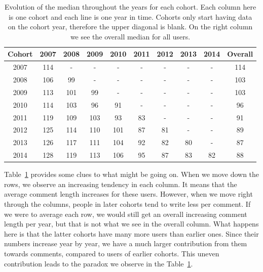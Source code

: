 \begin{table}[!tb]
\centering
\tabcolsep=0.11cm
\singlespacing
\fontsize{7pt}{8pt}\selectfont
\begin{tabular}{|c|c|c|c|c|c|c|c|c|c|}
\hline
Cohort & 2007 & 2008 & 2009 & 2010 & 2011 & 2012 & 2013 & 2014 & Overall\\ \hline
2007 & 114 & - & - & - & - & - & - & - & 114 \\ \hline
2008 & 106 & 99 & - & - & - & - & - & - & 103 \\ \hline
2009 & 113 & 101 & 99 & - & - & - & - & - & 103 \\ \hline
2010 & 114 & 103 & 96 & 91 & - & - & - & - & 96 \\ \hline
2011 & 119 & 109 & 103 & 93 & 83 & - & - & - & 91 \\ \hline
2012 & 125 & 114 & 110 & 101 & 87 & 81 & - & - & 89 \\ \hline
2013 & 126 & 117 & 111 & 104 & 92 & 82 & 80 & - & 87 \\ \hline
2014 & 128 & 119 & 113 & 106 & 95 & 87 & 83 & 82 & 88 \\ \hline
\end{tabular}
\caption{Evolution of the median throughout the years for each cohort. Each column here is one cohort and each line is one year in time. Cohorts only start having data on the cohort year, therefore the upper diagonal is blank. On the right column we see the overall median for all users.}
\label{tab:simpson}
\end{table}


Table~\ref{tab:simpson} provides some clues to what might be going on. When we move down the rows, we observe an increasing tendency in each column. It means that the average comment length increases for these users. However, when we move right through the columns, people in later cohorts tend to write less per comment. If we were to average each row, we would still get an overall increasing comment length per year, but that is not what we see in the overall column. What happens here is that the latter cohorts have many more users than earlier ones. Since their numbers increase year by year, we have a  much larger contribution from them towards comments, compared to users of earlier cohorts. This uneven contribution leads to the paradox we observe in the Table~\ref{tab:simpson}. 

